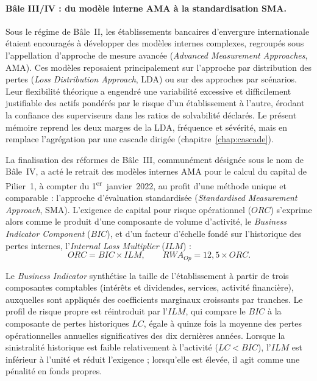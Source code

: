 \paragraph{Bâle III/IV : du modèle interne AMA à la standardisation SMA.}
Sous le régime de Bâle~II, les établissements bancaires d'envergure internationale
étaient encouragés à développer des modèles internes complexes, regroupés sous
l'appellation d'approche de mesure avancée (\emph{Advanced Measurement Approaches},
AMA). Ces modèles reposaient principalement sur l'approche par distribution des pertes
(\emph{Loss Distribution Approach}, LDA) ou sur des approches par scénarios. Leur flexibilité
théorique a engendré une variabilité excessive et difficilement justifiable des actifs pondérés
par le risque d'un établissement à l'autre, érodant la confiance des superviseurs dans les
ratios de solvabilité déclarés. Le présent mémoire reprend les deux marges de la LDA, fréquence
et sévérité, mais en remplace l'agrégation par une cascade dirigée
(chapitre~\ref{chap:cascade}).

La finalisation des réformes de Bâle~III, communément désignée sous le nom de Bâle~IV,
a acté le retrait des modèles internes AMA pour le calcul du capital de Pilier~1, à
compter du 1\textsuperscript{er}~janvier~2022, au profit d'une méthode unique et
comparable : l'approche d'évaluation standardisée (\emph{Standardised Measurement
Approach}, SMA). L'exigence de capital pour risque opérationnel ($ORC$) s'exprime alors
comme le produit d'une composante de volume d'activité, le \emph{Business Indicator
Component} ($BIC$), et d'un facteur d'échelle fondé sur l'historique des pertes internes,
l'\emph{Internal Loss Multiplier} ($ILM$) :
\begin{equation}
ORC = BIC \times ILM,
\qquad
RWA_{Op} = 12{,}5 \times ORC.
\end{equation}

Le \emph{Business Indicator} synthétise la taille de l'établissement à partir de trois
composantes comptables (intérêts et dividendes, services, activité financière), auxquelles
sont appliqués des coefficients marginaux croissants par tranches. Le profil de risque
propre est réintroduit par l'$ILM$, qui compare le $BIC$ à la composante de pertes
historiques $LC$, égale à quinze fois la moyenne des pertes opérationnelles annuelles
significatives des dix dernières années. Lorsque la sinistralité historique est faible
relativement à l'activité ($LC < BIC$), l'$ILM$ est inférieur à l'unité et réduit
l'exigence ; lorsqu'elle est élevée, il agit comme une pénalité en fonds propres.

